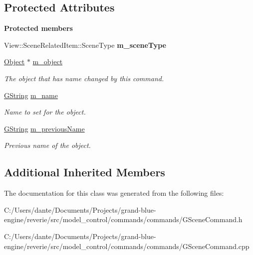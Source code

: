 \subsection*{Protected Attributes}
\begin{Indent}\textbf{ Protected members}\par
\begin{DoxyCompactItemize}
\item 
\mbox{\label{classrev_1_1_change_name_command_a6ba68ddaae2a20fc6d8aa83676bbbe70}} 
View\+::\+Scene\+Related\+Item\+::\+Scene\+Type {\bfseries m\+\_\+scene\+Type}
\item 
\mbox{\label{classrev_1_1_change_name_command_af5822a7a6ba9d368959556ae70bc7407}} 
\mbox{\hyperlink{classrev_1_1_object}{Object}} $\ast$ \mbox{\hyperlink{classrev_1_1_change_name_command_af5822a7a6ba9d368959556ae70bc7407}{m\+\_\+object}}
\begin{DoxyCompactList}\small\item\em The object that has name changed by this command. \end{DoxyCompactList}\item 
\mbox{\label{classrev_1_1_change_name_command_a9589e770201db72e643c9aed9f7d3ffe}} 
\mbox{\hyperlink{classrev_1_1_g_string}{G\+String}} \mbox{\hyperlink{classrev_1_1_change_name_command_a9589e770201db72e643c9aed9f7d3ffe}{m\+\_\+name}}
\begin{DoxyCompactList}\small\item\em Name to set for the object. \end{DoxyCompactList}\item 
\mbox{\label{classrev_1_1_change_name_command_a84e40d3e4f018d26803f64cb2a4b6b98}} 
\mbox{\hyperlink{classrev_1_1_g_string}{G\+String}} \mbox{\hyperlink{classrev_1_1_change_name_command_a84e40d3e4f018d26803f64cb2a4b6b98}{m\+\_\+previous\+Name}}
\begin{DoxyCompactList}\small\item\em Previous name of the object. \end{DoxyCompactList}\end{DoxyCompactItemize}
\end{Indent}
\subsection*{Additional Inherited Members}


The documentation for this class was generated from the following files\+:\begin{DoxyCompactItemize}
\item 
C\+:/\+Users/dante/\+Documents/\+Projects/grand-\/blue-\/engine/reverie/src/model\+\_\+control/commands/commands/G\+Scene\+Command.\+h\item 
C\+:/\+Users/dante/\+Documents/\+Projects/grand-\/blue-\/engine/reverie/src/model\+\_\+control/commands/commands/G\+Scene\+Command.\+cpp\end{DoxyCompactItemize}
